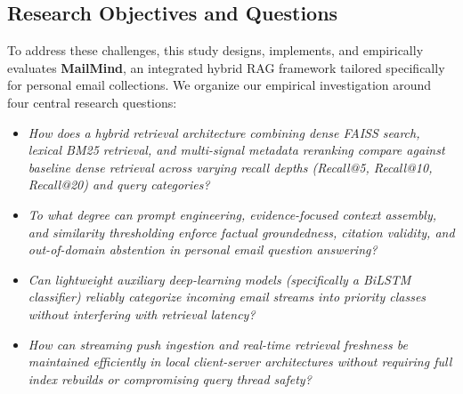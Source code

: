 \documentclass[11pt,a4paper]{article}
\begin{document}
\subsection{Research Objectives and Questions}
To address these challenges, this study designs, implements, and empirically evaluates \textbf{MailMind}, an integrated hybrid RAG framework tailored specifically for personal email collections. We organize our empirical investigation around four central research questions:
\begin{itemize}
    \item[\textbf{RQ1:}] \textit{How does a hybrid retrieval architecture combining dense FAISS search, lexical BM25 retrieval, and multi-signal metadata reranking compare against baseline dense retrieval across varying recall depths (Recall@5, Recall@10, Recall@20) and query categories?}
    \item[\textbf{RQ2:}] \textit{To what degree can prompt engineering, evidence-focused context assembly, and similarity thresholding enforce factual groundedness, citation validity, and out-of-domain abstention in personal email question answering?}
    \item[\textbf{RQ3:}] \textit{Can lightweight auxiliary deep-learning models (specifically a BiLSTM classifier) reliably categorize incoming email streams into priority classes without interfering with retrieval latency?}
    \item[\textbf{RQ4:}] \textit{How can streaming push ingestion and real-time retrieval freshness be maintained efficiently in local client-server architectures without requiring full index rebuilds or compromising query thread safety?}
\end{itemize}
\end{document}
